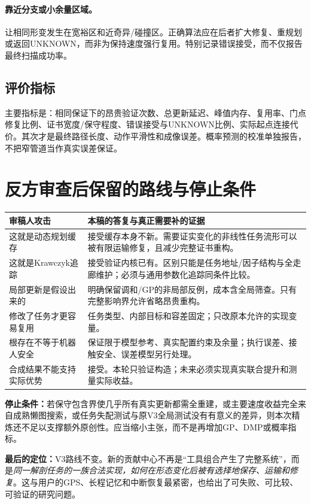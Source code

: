 \documentclass[UTF8,11pt,a4paper,fontset=fandol]{ctexart}
\numberwithin{equation}{section}
\theoremstyle{definition}
\begin{document}
\paragraph{靠近分支或小余量区域。}让相同形变发生在宽裕区和近奇异/碰撞区。正确算法应在后者扩大修复、重规划或返回UNKNOWN，而非为保持速度强行复用。特别记录错误接受，而不仅报告最终扫描成功率。

\subsection{评价指标}
主要指标是：相同保证下的昂贵验证次数、总更新延迟、峰值内存、复用率、门点修复比例、证书宽度/保守程度、错误接受与UNKNOWN比例、实际起点连接代价。其次才是最终路径长度、动作平滑性和成像误差。概率预测的校准单独报告，不把窄管道当作真实误差保证。

\section{反方审查后保留的路线与停止条件}
\begin{table}[H]\centering\small
\begin{tabularx}{\textwidth}{p{}Y}\toprule
审稿人攻击 & 本稿的答复与真正需要补的证据\\\midrule
这就是动态规划缓存 & 接受缓存本身不新。需要证实变化的非线性任务流形可以被有限运输修复，且减少完整证书重构。\\
这就是Krawczyk追踪 & 接受验证内核已有。区别只能是任务地址/因子结构与全走廊维护；必须与通用参数化追踪同条件比较。\\
局部更新是假设出来的 & 明确保留调和/GP的非局部反例，成本含全局筛查。只有完整影响界允许省略昂贵重构。\\
修改了任务才更容易复用 & 任务类型、内部目标和容差固定；只改原本允许的实现变量。\\
根存在不等于机器人安全 & 保证限于模型参考、真实配置约束及余量；执行误差、接触安全、误差模型另行处理。\\
合成结果不能支持实际优势 & 接受。本轮只验证构造；未来必须实现真实联合提升和测量实际收益。\\\bottomrule
\end{tabularx}
\end{table}

\textbf{停止条件：}若保守包含界使几乎所有真实更新都需全重建，或主要速度收益完全来自成熟懒图搜索，或任务失配测试与原V3全局测试没有有意义的差异，则本次精炼还不足以支撑额外原创性。应当缩小主张，而不是再增加GP、DMP或概率指标。

\textbf{最后的定位：}V3路线不变。新的贡献中心不再是“工具组合产生了完整系统”，而是\emph{同一解剖任务的一族合法实现，如何在形态变化后被有选择地保存、运输和修复}。这与用户的GPS、长程记忆和中断恢复最紧密，也给出了可失败、可比较、可验证的研究问题。
\end{document}
